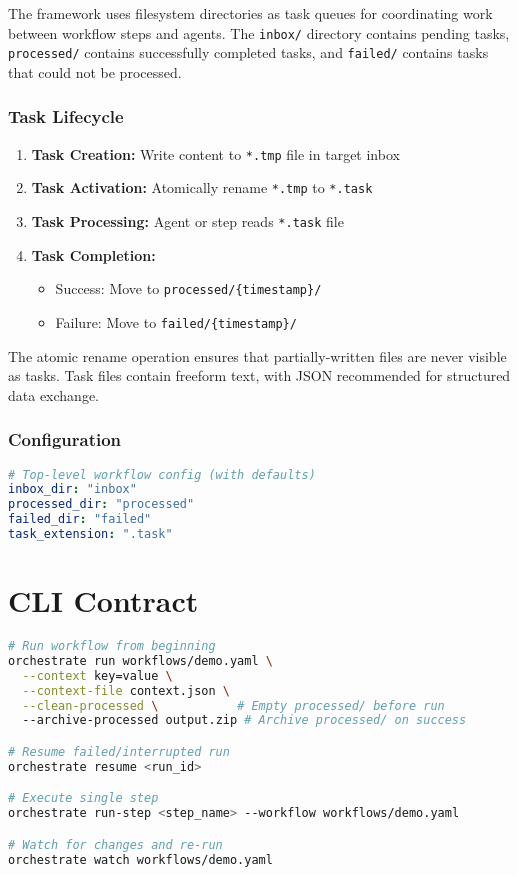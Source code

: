 \documentclass[11pt,a4paper]{article}
\begin{document}
The framework uses filesystem directories as task queues for coordinating work between workflow steps and agents. The \texttt{inbox/} directory contains pending tasks, \texttt{processed/} contains successfully completed tasks, and \texttt{failed/} contains tasks that could not be processed.

\subsubsection{Task Lifecycle}
\begin{enumerate}
    \item \textbf{Task Creation:} Write content to \texttt{*.tmp} file in target inbox
    \item \textbf{Task Activation:} Atomically rename \texttt{*.tmp} to \texttt{*.task}
    \item \textbf{Task Processing:} Agent or step reads \texttt{*.task} file
    \item \textbf{Task Completion:}
    \begin{itemize}
        \item Success: Move to \texttt{processed/\{timestamp\}/}
        \item Failure: Move to \texttt{failed/\{timestamp\}/}
    \end{itemize}
\end{enumerate}

The atomic rename operation ensures that partially-written files are never visible as tasks. Task files contain freeform text, with JSON recommended for structured data exchange.

\subsubsection{Configuration}

\begin{lstlisting}[language=yaml, caption={Inbox Configuration}]
# Top-level workflow config (with defaults)
inbox_dir: "inbox"
processed_dir: "processed"
failed_dir: "failed"
task_extension: ".task"
\end{lstlisting}

\section{CLI Contract}

\begin{lstlisting}[language=bash, caption={CLI Commands}]
# Run workflow from beginning
orchestrate run workflows/demo.yaml \
  --context key=value \
  --context-file context.json \
  --clean-processed \           # Empty processed/ before run
  --archive-processed output.zip # Archive processed/ on success

# Resume failed/interrupted run
orchestrate resume <run_id>

# Execute single step
orchestrate run-step <step_name> --workflow workflows/demo.yaml

# Watch for changes and re-run
orchestrate watch workflows/demo.yaml
\end{lstlisting}
\end{document}
